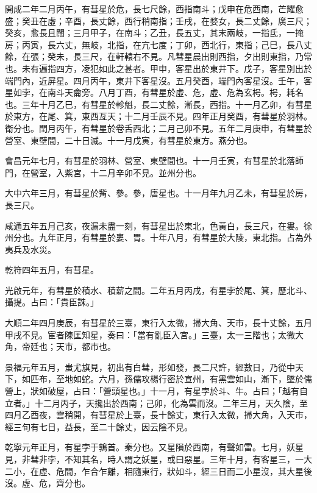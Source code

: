 \begin{pinyinscope}
 開成二年二月丙午，有彗星於危，長七尺餘，西指南斗；戊申在危西南，芒耀愈盛；癸丑在虛；辛酉，長丈餘，西行稍南指；壬戌，在婺女，長二丈餘，廣三尺；癸亥，愈長且闊；三月甲子，在南斗；乙丑，長五丈，其末兩岐，一指氐，一掩房；丙寅，長六丈，無岐，北指，在亢七度；丁卯，西北行，東指；己巳，長八丈餘，在張；癸未，長三尺，在軒轅右不見。凡彗星晨出則西指，夕出則東指，乃常也。未有遍指四方，凌犯如此之甚者。甲申，客星出於東井下。戊子，客星別出於端門內，近屏星。四月丙午，東井下客星沒。五月癸酉，端門內客星沒。壬午，客星如孛，在南斗天龠旁。八月丁酉，有彗星於虛、危，虛、危為玄枵。枵，耗名也。三年十月乙巳，有彗星於軫魁，長二丈餘，漸長，西指。十一月乙卯，有彗星於東方，在尾、箕，東西亙天；十二月壬辰不見。四年正月癸酉，有彗星於羽林。衛分也。閏月丙午，有彗星於卷舌西北；二月己卯不見。五年二月庚申，有彗星於營室、東壁間，二十日滅。十一月戊寅，有彗星於東方。燕分也。



 會昌元年七月，有彗星於羽林、營室、東壁間也。十一月壬寅，有彗星於北落師門，在營室，入紫宮，十二月辛卯不見。並州分也。



 大中六年三月，有彗星於觜、參。參，唐星也。十一月年九月乙未，有彗星於房，長三尺。



 咸通五年五月己亥，夜漏未盡一刻，有彗星出於東北，色黃白，長三尺，在婁。徐州分也。九年正月，有彗星於婁、胃。十年八月，有彗星於大陵，東北指。占為外夷兵及水災。



 乾符四年五月，有彗星。



 光啟元年，有彗星於積水、積薪之間。二年五月丙戌，有星孛於尾、箕，歷北斗、攝提。占曰：「貴臣誅。」



 大順二年四月庚辰，有彗星於三臺，東行入太微，掃大角、天市，長十丈餘，五月甲戌不見。宦者陳匡知星，奏曰：「當有亂臣入宮。」三臺，太一三階也；太微大角，帝廷也；天市，都市也。



 景福元年五月，蚩尤旗見，初出有白彗，形如發，長二尺許，經數日，乃從中天下，如匹布，至地如蛇。六月，孫儒攻楊行密於宣州，有黑雲如山，漸下，墜於儒營上，狀如破屋，占曰：「營頭星也。」十一月，有星孛於斗、牛。占曰；「越有自立者。」十二月丙子，天攙出於西南；己卯，化為雲而沒。二年三月，天久陰，至四月乙酉夜，雲稍開，有彗星於上臺，長十餘丈，東行入太微，掃大角，入天市，經三旬有七日，益長，至二十餘丈，因云陰不見。



 乾寧元年正月，有星孛于鶉首。秦分也。又星隕於西南，有聲如雷。七月，妖星見，非彗非孛，不知其名，時人謂之妖星，或曰惡星。三年十月，有客星三，一大二小，在虛、危間，乍合乍離，相隨東行，狀如斗，經三日而二小星沒，其大星後沒。虛、危，齊分也。




\end{pinyinscope}
